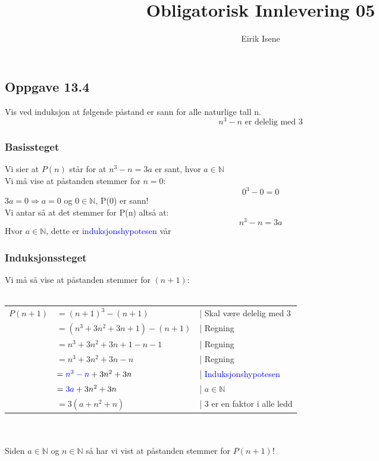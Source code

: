 \documentclass[norsk, 12p]{article}
\title{Obligatorisk Innlevering 05}
\author{Eirik Isene}
\newcommand{\hl}[1]{\textcolor{blue}{#1}}
\begin{document}
\maketitle

\subsection{Oppgave 13.4}
Vis ved induksjon at følgende påstand er sann for alle naturlige tall n.
$$n^3 - n \text{ er delelig med 3}$$

\subsubsection{Basissteget}
Vi sier at $P(n)$ står for at $n^3 - n = 3a$ er sant, hvor $a \in \mathbb{N}$ \\ 
Vi må vise at påstanden stemmer for $n = 0$:
$$0^3 - 0  =  0$$
$3a = 0 \Rightarrow a = 0$ og $0 \in \mathbb{N}$, P(0) er sann! \\
Vi antar så at det stemmer for P(n) altså at:
$$n^3 - n = 3a$$
Hvor $a \in \mathbb{N}$, dette er \hl{induksjonshypotesen} vår

\subsubsection{Induksjonssteget}
Vi må så vise at påstanden stemmer for $(n+1)$: \\ \\
\begin{tabular}{r l l}
$P(n+1)$ & $=(n + 1)^3 - (n + 1)$             & | Skal være delelig med $3$ \\ 
         & $=(n^3 + 3n^2 + 3n + 1) - (n + 1)$ & | Regning \\
         & $=n^3 + 3n^2 + 3n + 1 - n - 1$     & | Regning \\
         & $=n^3 + 3n^2 + 3n - n$             & | Regning \\
         & $=\hl{n^3 - n} + 3n^2 + 3n$        & | \hl{Induksjonshypotesen} \\
         & $=\hl{3a} + 3n^2 + 3n$             & | $a \in \mathbb{N}$  \\
         & $=3(a + n^2 + n)$                  & | $3$ er en faktor i alle ledd \\
\end{tabular} \\ \\
Siden $a \in \mathbb{N}$ og $n \in \mathbb{N}$ så har vi vist at påstanden stemmer for $P(n+1)$!
\end{document}

